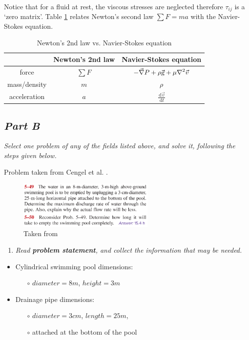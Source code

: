 \documentclass{article}
\newcommand{\ud}{\,\mathrm{d}}
\begin{document}
Notice that for a fluid at rest, the viscous stresses are neglected therefore $\tau_{ij}$ is a   `zero matrix'. Table \ref{tb_NewtonNavierStokes} relates Newton's second law $\displaystyle \sum F = m a$ with the Navier-Stokes equation.

\begin{table}[h!]
\caption{Newton's 2nd law vs. Navier-Stokes equation}
\begin{center}
\begin{tabular}{ c | c   c }
                 & Newton's 2nd law & Navier-Stokes equation \\
    \hline
    force        & $\displaystyle \sum F$ & $\displaystyle - \vec{\nabla} P + \rho \vec{\textsl{g}} + \mu \nabla^2 \vec{v}$ \\
    mass/density & $\displaystyle m$ & $\displaystyle \rho$ \\
    acceleration & $\displaystyle a$ & $\displaystyle \frac{\ud \vec{v}}{\ud t}$
\end{tabular}
\end{center}
\label{tb_NewtonNavierStokes}
\end{table}

\subsection*{\emph{Part B}}
\textit{Select one problem of any of the fields listed above, and solve it, following the steps given below.}

Problem taken from Cengel et al. \cite{Cengel2017}.

\begin{figure}[h!]
\centering
\includegraphics[width=0.60\textwidth]{./img/PROBLEMBernoulliEquation.png}
\caption{Taken from \cite{Cengel2017}}
\label{fig_PROBLEMBernoulliEquation}
\end{figure}

\begin{enumerate}
\item \textit{Read \textbf{problem statement}, and collect the information that may be needed.}
\end{enumerate}

\begin{itemize}
\item Cylindrical swimming pool dimensions:
    \begin{itemize}
    \item[$\circ$] $diameter = 8 m$, $height = 3 m$
    \end{itemize}
\item Drainage pipe dimensions:
    \begin{itemize}
    \item[$\circ$] $diameter = 3 cm$, $length = 25 m$,
    \item[$\circ$] attached at the bottom of the pool
    \end{itemize}
\end{itemize}
\end{document}
